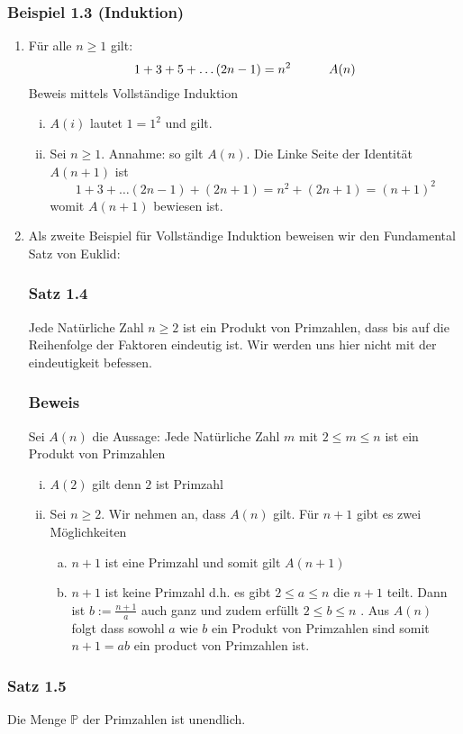 \subsubsection*{Beispiel 1.3 (Induktion)}
\begin{enumerate}
\item Für alle $n\geq 1$ gilt: $$1+3+5+\dots (2n-1)=n^2\text{\indent\indent}A(n)$$ Beweis mittels Vollständige Induktion
\begin{enumerate}[i)]
\item $A(i)$ lautet $1=1^2$ und gilt.
\item Sei $n\geq 1$. Annahme: so gilt $A(n)$. Die Linke Seite der Identität $A(n+1)$ ist \[1+3+\dots (2n-1)+(2n+1)=n^{2}+(2n+1)=(n+1)^2\] womit $A(n+1)$ bewiesen ist.
\end{enumerate}
\item Als zweite Beispiel für Vollständige Induktion beweisen wir den Fundamental Satz von Euklid:
\subsubsection*{Satz 1.4}
Jede Natürliche Zahl $n\geq 2$ ist ein Produkt von Primzahlen, dass bis auf die Reihenfolge der Faktoren eindeutig ist. Wir werden uns hier nicht mit der eindeutigkeit befessen.
\subsubsection*{Beweis}
Sei $A(n)$ die Aussage: Jede Natürliche Zahl $m$ mit $2\leq m\leq n$ ist ein Produkt von Primzahlen
\begin{enumerate}[i)]
\item $A(2)$ gilt denn $2$ ist Primzahl
\item Sei $n\geq 2$. Wir nehmen an, dass $A(n)$ gilt. Für $n+1$ gibt es zwei Möglichkeiten
\begin{enumerate}[a)]
\item $n+1$ ist eine Primzahl und somit gilt $A(n+1)$ 
\item $n+1$ ist keine Primzahl d.h. es gibt $2\leq a\leq n$ die $n+1$ teilt. Dann ist $b:=\frac{n+1}{a}$ auch ganz und zudem erfüllt $2\leq b\leq n$ . Aus $A(n)$ folgt dass sowohl $a$ wie $b$ ein Produkt von Primzahlen sind somit $n+1=ab$ ein product von Primzahlen ist. 
\end{enumerate}
\end{enumerate}
\end{enumerate}
\subsubsection*{Satz 1.5}
Die Menge $\mathbb{P}$ der Primzahlen ist unendlich.
